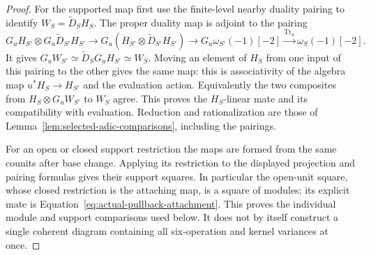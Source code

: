 \documentclass[11pt]{article}
\theoremstyle{definition}
\theoremstyle{remark}
\begin{document}
\begin{proof}
For the supported map first use the finite-level nearby duality
pairing to identify $W_S=\widetilde D_SH_S$.  The proper duality
map is adjoint to the pairing
\[
 G_uH_{S'}\otimes G_u\widetilde D_{S'}H_{S'}
 \longrightarrow G_u(H_{S'}\otimes\widetilde D_{S'}H_{S'})
 \longrightarrow G_u\omega_{S'}(-1)[-2]
 \xrightarrow{\mathrm{Tr}_u}\omega_S(-1)[-2].
\]
It gives $G_uW_{S'}\simeq\widetilde D_SG_uH_{S'}\simeq W_S$.
Moving an element of $H_S$ from one input of this pairing to the
other gives the same map: this is associativity of the algebra
map $u^*H_S\to H_{S'}$ and the evaluation action.  Equivalently the
two composites from $H_S\otimes G_uW_{S'}$ to $W_S$ agree.  This
proves the $H_S$-linear mate and its compatibility with evaluation.
Reduction and rationalization are those of
Lemma~\ref{lem:selected-adic-comparisons}, including the pairings.

For an open or closed support restriction the maps are formed from
the same counits after base change.  Applying its restriction to
the displayed projection and pairing formulas gives their support
squares.  In particular the open-unit square, whose closed
restriction is the attaching map, is a square of modules; its
explicit mate is Equation~\eqref{eq:actual-pullback-attachment}.
This proves the individual module and support comparisons used below.
It does not by itself construct a single coherent diagram containing
all six-operation and kernel variances at once.
\end{proof}
\end{document}
